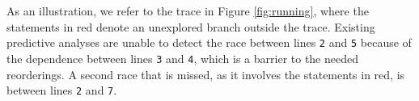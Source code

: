 As an illustration, we refer to the trace in Figure \ref{fig:running}, where the statements in red denote an unexplored branch outside the trace. Existing predictive analyses are unable to detect the race between lines {\tt 2} and {\tt 5} because of the dependence between lines {\tt 3} and {\tt 4}, which is a barrier to the needed reorderings. A second race that is missed, as it involves the statements in red, is between lines {\tt 2} and {\tt 7}.



%
%


